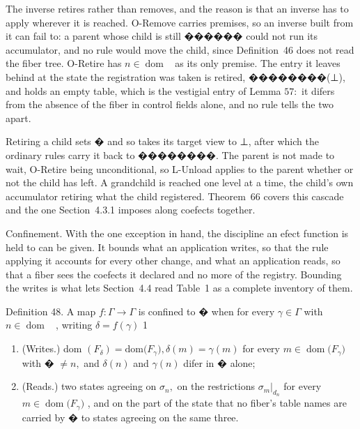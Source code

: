 \documentclass[
  10
]{article}
\begin{document}
The inverse retires rather than removes, and the reason is that an
inverse has to apply wherever it is reached. O-Remove carries premises,
so an inverse built from it can fail to: a parent whose child is still
������ could not run its accumulator, and no rule would move the child,
since Definition~46 does not read the fiber tree. O-Retire has
\(n \in \mathop { \mathrm { d o m } } \mathop { \left( F _ { \gamma } \right) }\)
as its only premise. The entry it leaves behind at the state the
registration was taken is retired, ��������(⊥), and holds an empty
table, which is the vestigial entry of Lemma \(5 7 { : }\) it difers
from the absence of the fiber in control fields alone, and no rule tells
the two apart.

Retiring a child sets � and so takes its target view to ⊥, after which
the ordinary rules carry it back to ��������. The parent is not made to
wait, O-Retire being unconditional, so L-Unload applies to the parent
whether or not the child has left. A grandchild is reached one level at
a time, the child's own accumulator retiring what the child registered.
Theorem~66 covers this cascade and the one Section~4.3.1 imposes along
coefects together.

Confinement. With the one exception in hand, the discipline an efect
function is held to can be given. It bounds what an application writes,
so that the rule applying it accounts for every other change, and what
an application reads, so that a fiber sees the coefects it declared and
no more of the registry. Bounding the writes is what lets Section~4.4
read Table~1 as a complete inventory of them.

Definition 48. A map \(f : \Gamma \to \Gamma\) is confined to � when for
every \(\gamma \in \Gamma\) with
\(n \in \mathop { \mathrm { d o m } } \mathop { \left( F _ { \gamma } \right) }\)
, writing \(\delta = f ( \gamma )\) 1

\begin{enumerate}
\def\labelenumi{\arabic{enumi}.}
\item
  (Writes.) dom
  \(( F _ { \delta } ) = \mathrm { d o m } \big ( F _ { \gamma } \big ) , \delta ( m ) = \gamma ( m )\)
  for every
  \(m \in \mathop { \mathrm { d o m } } \bigl ( F _ { \gamma } \bigr )\)
  with � \(\neq n ,\) and \(\delta ( n )\) and \(\gamma ( n )\) difer in
  � alone;
\item
  (Reads.) two states agreeing on \(\sigma _ { n } ,\) on the
  restrictions \(\sigma _ { m } | _ { d _ { n } }\) for every
  \(m \in \mathop { \mathrm { d o m } } \bigl ( F _ { \gamma } \bigr )\)
  , and on the part of the state that no fiber's table names are carried
  by � to states agreeing on the same three.
\end{enumerate}
\end{document}

